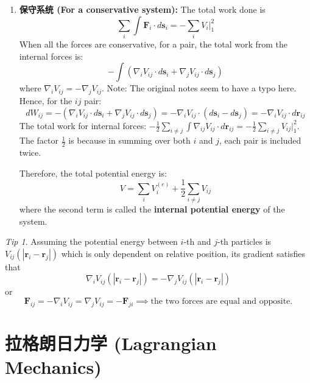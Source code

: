 \documentclass[12pt,a4paper]{article}
\theoremstyle{definition}
\theoremstyle{remark}
\newtheorem*{tip}{Tip}
\renewcommand{\vec}[1]{\mathbf{#1}}
\begin{document}
\begin{enumerate}
		\item \textbf{保守系统 (For a conservative system):}
		The total work done is
		\begin{equation*}
			\sum_i \int \vec{F}_i \cdot d\vec{s}_i = -\sum_i V_i \Big|_1^2
		\end{equation*}
		When all the forces are conservative, for a pair, the total work from the internal forces is:
		\begin{equation*}
			-\int (\nabla_i V_{ij} \cdot d\vec{s}_i + \nabla_j V_{ij} \cdot d\vec{s}_j)
		\end{equation*}
		where $\nabla_i V_{ij} = -\nabla_j V_{ij}$. Note: The original notes seem to have a typo here.
		Hence, for the $ij$ pair:
		\begin{equation*}
			dW_{ij} = -(\nabla_i V_{ij} \cdot d\vec{s}_i + \nabla_j V_{ij} \cdot d\vec{s}_j) = -\nabla_i V_{ij} \cdot (d\vec{s}_i - d\vec{s}_j) = -\nabla_i V_{ij} \cdot d\vec{r}_{ij}
		\end{equation*}
		The total work for internal forces: $-\frac{1}{2} \sum_{i \neq j} \int \nabla_{ij} V_{ij} \cdot d\vec{r}_{ij} = -\frac{1}{2}\sum_{i \neq j} V_{ij} \Big|_1^2$. The factor $\frac{1}{2}$ is because in summing over both $i$ and $j$, each pair is included twice.
		
		Therefore, the total potential energy is:
		\begin{equation*}
			V = \sum_i V_i^{(e)} + \frac{1}{2} \sum_{i \neq j} V_{ij}
		\end{equation*}
		where the second term is called the \textbf{internal potential energy} of the system.
	\end{enumerate}
	
	\begin{tip}
		Assuming the potential energy between $i$-th and $j$-th particles is $V_{ij}(|\vec{r}_i - \vec{r}_j|)$ which is only dependent on relative position, its gradient satisfies that
		\begin{equation*}
			\nabla_i V_{ij}(|\vec{r}_i - \vec{r}_j|) = - \nabla_j V_{ij}(|\vec{r}_i - \vec{r}_j|)
		\end{equation*}
		or
		\begin{equation*}
			\vec{F}_{ij} = -\nabla_i V_{ij} = \nabla_j V_{ij} = -\vec{F}_{ji} \implies \text{the two forces are equal and opposite.}
		\end{equation*}
	\end{tip}
	
	\newpage
	\section{拉格朗日力学 (Lagrangian Mechanics)}
	
\end{document}

